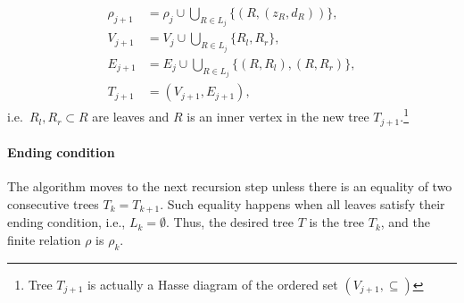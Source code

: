 \begin{align*}
   \rho_{j+1} &= \rho_j \cup \bigcup_{R \in L_j} \{(R, (z_R, d_R))\}, \\
   V_{j+1} &= V_j \cup \bigcup_{R \in L_j} \{R_l, R_r\}, \\
   E_{j+1} &= E_j \cup \bigcup_{R \in L_j} \{(R, R_l), (R,R_r)\},\\
   T_{j+1} &= (V_{j+1}, E_{j+1}),
\end{align*}
i.e.~${R_l, R_r} \subset R$ are leaves and $R$ is an inner vertex in the new tree
\(T_{j+1}\).\footnote{Tree \(T_{j+1}\) is actually a Hasse diagram of the ordered set
\((V_{j+1},\subseteq)\)}


\paragraph{Ending condition} The algorithm moves to the next recursion step unless there is an equality of two consecutive trees \(T_k = T_{k+1}\). Such equality happens when all leaves satisfy their ending condition, i.e., \(L_k = \emptyset\).
Thus, the desired tree $T$ is the tree $T_k$, and the finite relation $\rho$ is $\rho_k$.


